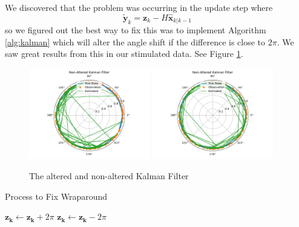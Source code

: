 \documentclass[11pt]{amsart}
\begin{document}
We discovered that the problem was occurring in the update step where \[\mathbf{\tilde{y}}_k = \mathbf{z}_k - H\mathbf{\hat{x}}_{k|k-1}\]
so we figured out the best way to fix this was to implement Algorithm \ref{alg:kalman} which will alter the angle shift if the difference is close 
to $2\pi$. We saw great results from this in our stimulated data.
See Figure \ref{fig:simple_kalman}.

\begin{figure}[htp]
    \centering
    \includegraphics[width=0.47\textwidth]{non_altered_kalman.pdf}\hfill
    \includegraphics[width=0.47\textwidth]{altered_kalman.pdf}\hfill
    \caption{The altered and non-altered Kalman Filter}
    \label{fig:simple_kalman}
\end{figure}



\begin{algorithm}
    \caption{Process to Fix Wraparound}\label{alg:kalman}    
    \begin{algorithmic}
            \State $\mathbf{z_k} \gets \mathbf{z_k} + 2\pi$
            \State $\mathbf{z_k} \gets \mathbf{z_k} - 2\pi$
        \EndIf 
        \end{algorithmic}
    \end{algorithm}

\end{document}
